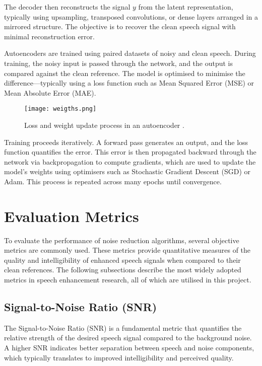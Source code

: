 The decoder then reconstructs the signal \(y\) from the latent representation, typically using upsampling, transposed convolutions, or dense layers arranged in a mirrored structure. The objective is to recover the clean speech signal with minimal reconstruction error.

Autoencoders are trained using paired datasets of noisy and clean speech. During training, the noisy input is passed through the network, and the output is compared against the clean reference. The model is optimised to minimise the difference—typically using a loss function such as Mean Squared Error (MSE) or Mean Absolute Error (MAE).

\begin{figure}[h]
    \centering
    \texttt{[image: weigths.png]}
    \caption{\label{fig:weigths} Loss and weight update process in an autoencoder \cite{epoch2021}.}
\end{figure}

Training proceeds iteratively. A forward pass generates an output, and the loss function quantifies the error. This error is then propagated backward through the network via backpropagation to compute gradients, which are used to update the model’s weights using optimisers such as Stochastic Gradient Descent (SGD) or Adam. This process is repeated across many epochs until convergence.


\section{Evaluation Metrics}
\label{sec:evaluation_metrics}

To evaluate the performance of noise reduction algorithms, several objective metrics are commonly used. These metrics provide quantitative measures of the quality and intelligibility of enhanced speech signals when compared to their clean references. The following subsections describe the most widely adopted metrics in speech enhancement research, all of which are utilised in this project.

\subsection{Signal-to-Noise Ratio (SNR)}
\label{subsec:snr}

The Signal-to-Noise Ratio (SNR) is a fundamental metric that quantifies the relative strength of the desired speech signal compared to the background noise. A higher SNR indicates better separation between speech and noise components, which typically translates to improved intelligibility and perceived quality.

